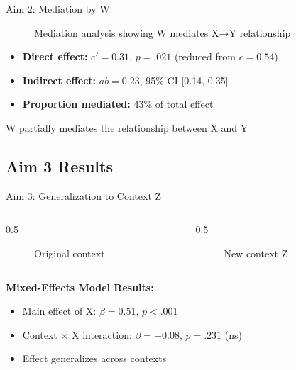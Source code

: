 \documentclass[aspectratio=169,11pt]{beamer}
\begin{document}
\begin{frame}{Aim 2: Mediation by W}
  \begin{figure}
    \centering
    \caption{Mediation analysis showing W mediates X→Y relationship}
  \end{figure}

  \begin{itemize}
    \item \textbf{Direct effect:} $c' = 0.31$, $p = .021$ (reduced from $c = 0.54$)
    \item \textbf{Indirect effect:} $ab = 0.23$, 95\% CI [0.14, 0.35]
    \item \textbf{Proportion mediated:} 43\% of total effect
  \end{itemize}

  \vspace{0.3cm}

  \alert{W partially mediates the relationship between X and Y}
\end{frame}

\subsection{Aim 3 Results}

\begin{frame}{Aim 3: Generalization to Context Z}
  \begin{columns}[T]

    \begin{column}{0.5\textwidth}
      \begin{figure}
        \centering
        \framebox[0.9\textwidth][c]{[Context 1]}
        \caption{Original context}
      \end{figure}
    \end{column}

    \begin{column}{0.5\textwidth}
      \begin{figure}
        \centering
        \framebox[0.9\textwidth][c]{[Context 2]}
        \caption{New context Z}
      \end{figure}
    \end{column}

  \end{columns}

  \vspace{0.5cm}

  \textbf{Mixed-Effects Model Results:}
  \begin{itemize}
    \item Main effect of X: $\beta = 0.51$, $p < .001$
    \item Context × X interaction: $\beta = -0.08$, $p = .231$ (ns)
    \item \alert{Effect generalizes across contexts}
  \end{itemize}
\end{frame}
\end{document}
